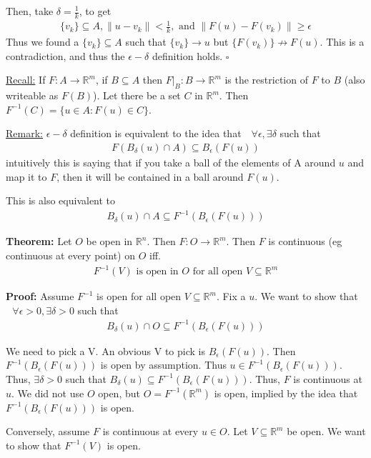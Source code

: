 \documentclass{article}
\newcommand*{\qed}{\hfill$\square$}%
\newcommand*{\txt}[1]{\text{ #1 }}%
\newcommand*{\fora}{\txt{}\forall}%
\newcommand*{\rr}{\mathbb{R}}%
\begin{document}
Then, take $\delta=\frac{1}{k}$, to get \begin{align*}
    \{v_k\}\subseteq A, \|u-v_k\|<\frac{1}{k},\txt{and}\|F(u)-F(v_k)\|\geq\epsilon
\end{align*}
Thus we found a $\{v_k\}\subseteq A$ such that $\{v_k\}\to u$ but $\{F(v_k)\}\not\to F(u)$. This is a contradiction, and thus the $\epsilon-\delta$ definition holds. \qed

\underline{Recall:} If $F:A\to \rr^m$, if $B\subseteq A$ then $F|_B:B\to \rr^m$ is the restriction of $F$ to $B$ (also writeable as $F(B)$). Let there be a set $C$ in $\rr^m$. Then $F^{-1}(C)=\{u\in A:F(u)\in C\}$.

\underline{Remark:} $\epsilon-\delta$ definition is equivalent to the idea that $\fora \epsilon, \exists \delta$ such that \begin{align*}
    F(B_\delta(u)\cap A)\subseteq B_\epsilon(F(u))
\end{align*}
intuitively this is saying that if you take a ball of the elements of A around $u$ and map it to $F$, then it will be contained in a ball around $F(u)$.

This is also equivalent to \begin{align*}
    B_\delta(u)\cap A \subseteq F^{-1}(B_\epsilon(F(u)))
\end{align*}

\textbf{Theorem:} Let $O$ be open in $\rr^n$. Then $F:O\to \rr^m$. Then $F$ is continuous (eg continuous at every point) on $O$ iff. \begin{align*}
    F^{-1}(V)\txt{ is open in }O\txt{ for all open }V\subseteq \rr^m
\end{align*}

\textbf{Proof:} Assume $F^{-1}$ is open for all open $V\subseteq \rr^m$. Fix a $u$. We want to show that $\fora \epsilon>0, \exists \delta>0$ such that \begin{align*}
    B_\delta(u)\cap O \subseteq F^{-1}(B_\epsilon(F(u)))
\end{align*}

We need to pick a V. An obvious V to pick is $B_\epsilon(F(u))$. Then $F^{-1}(B_\epsilon(F(u)))$ is open by assumption. Thus $u\in F^{-1}(B_\epsilon(F(u)))$. Thus, $\exists \delta>0$ such that $B_\delta(u)\subseteq F^{-1}(B_\epsilon(F(u)))$. Thus, $F$ is continuous at $u$. We did not use $O$ open, but $O=F^{-1}(\rr^m)$ is open, implied by the idea that $F^{-1}(B_\epsilon(F(u)))$ is open.

Conversely, assume $F$ is continuous at every $u\in O$. Let $V\subseteq \rr^m$ be open. We want to show that $F^{-1}(V)$ is open. 
\end{document}
